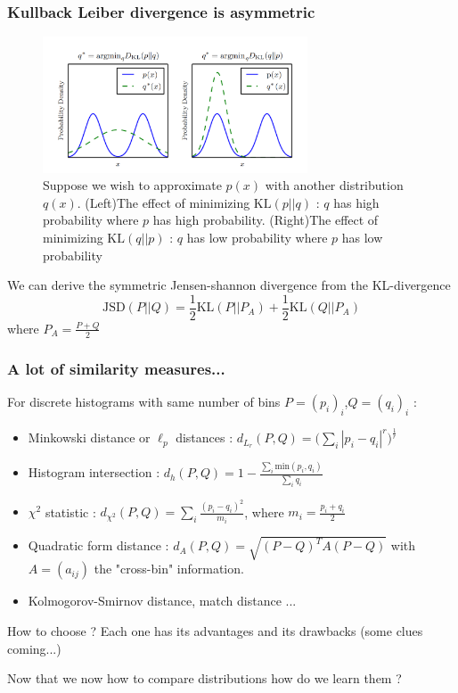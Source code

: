 \documentclass[french,9pt]{beamer}
\begin{document}
\begin{frame}
\frametitle{Kullback Leiber divergence is asymmetric}

\begin{figure}
  \begin{center}
    \includegraphics[width=0.7\textwidth]{fig/asymkl.png}
  \end{center}
  \caption{{\small Suppose we wish to approximate $p(x)$ with another distribution $q(x)$. (Left)The effect of minimizing $\text{KL}(p||q)$ : $q$ has high probability where $p$ has high probability. (Right)The effect of minimizing $\text{KL}(q||p)$ : $q$ has low probability where $p$ has low probability \cite{DBLP:journals/nature/LeCunBH15}}}
\end{figure}

We can derive the symmetric Jensen-shannon divergence from the KL-divergence 
\begin{equation}
\label{kldiv}
\text{JSD}(P||Q)=\frac{1}{2} \text{KL}(P||P_{A}) + \frac{1}{2} \text{KL}(Q||P_{A})
\end{equation}
where $P_{A}=\frac{P+Q}{2}$
 
\end{frame}

\begin{frame}
\frametitle{A lot of similarity measures...  \cite{Rubner2000}}

For discrete histograms with same number of bins $P=(p_{i})_{i}$,$Q=(q_{i})_{i}$ :

\begin{itemize}
\item Minkowski distance or $\ell_{p}$ distances : $d_{L_{r}}(P,Q)= \big(\sum_{i} |p_{i}-q_{i}|^{r}\big)^{\frac{1}{r}}$
\item Histogram intersection : $d_{h}(P,Q)= 1-\frac{\sum_{i} \text{min}(p_{i},q_{i})}{\sum_{i}q_{i}}$
\item$\chi^{2}$ statistic : $d_{\chi^{2}}(P,Q)= \sum_{i} \frac{(p_{i}-q_{i})^{2}}{m_{i}}$, where $m_{i}=\frac{p_{i}+q_{i}}{2}$
\item Quadratic form distance : $d_{A}(P,Q)=\sqrt{(P-Q)^{T} A (P-Q)}$ with $A=(a_{ij})$ the "cross-bin" information.
\item Kolmogorov-Smirnov distance, match distance ...
\end{itemize}

\pause 

How to choose ? Each one has its advantages and its drawbacks (some clues coming...)

\pause 
Now that we now how to compare distributions how do we learn them ?

\end{frame}
\end{document}
